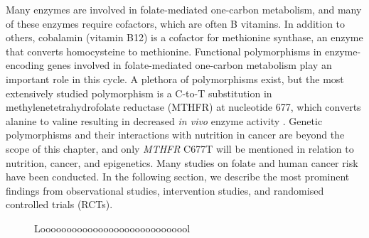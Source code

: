 \noindent Many enzymes are involved in folate-mediated one-carbon metabolism, and many of these enzymes require cofactors, which are often B vitamins. In addition to others, cobalamin (vitamin B12) is a cofactor for methionine synthase, an enzyme that converts homocysteine to methionine. Functional polymorphisms in enzyme-encoding genes involved in folate-mediated one-carbon metabolism play an important role in this cycle. A plethora of polymorphisms exist, but the most extensively studied polymorphism is a C-to-T substitution in methylenetetrahydrofolate reductase (MTHFR) at nucleotide 677, which converts alanine to valine resulting in decreased \emph{in vivo} enzyme activity \cite{c228}. Genetic polymorphisms and their interactions with nutrition in cancer are beyond the scope of this chapter, and only \emph{MTHFR} C677T will be mentioned in relation to nutrition, cancer, and epigenetics. Many studies on folate and human cancer risk have been conducted. In the following section, we describe the most 
prominent findings from observational studies, intervention studies, and randomised controlled trials (RCTs).

\begin{figure} 
\caption{Looooooooooooooooooooooooooool} 
\label{figure1_1} 
\end{figure}

